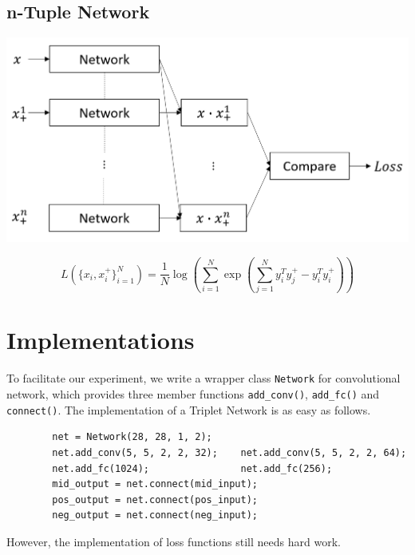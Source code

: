\documentclass[a0,portrait]{a0poster}
\begin{document}
\begin{multicols}{2}
		\subsection*{n-Tuple Network}
		
		\begin{center}\vspace{1cm}
			\includegraphics[width=0.7\linewidth]{../report_shaoheng/tuple_struct}
		\end{center}\vspace{1cm}
		\begin{equation}
		L(\{x_i,x_i^+\}^N_{i=1})=\frac{1}{N}\log(\sum_{i=1}^N\exp(\sum_{j=1}^Ny^T_iy_j^+-y_i^Ty_i^+))  \label{eq:n-pair}
		\end{equation}
		
		\nocite{*} %
		
		
		\section*{Implementations}
		To facilitate our experiment, we write a wrapper class \verb|Network| for convolutional network, which provides three member functions \verb|add_conv()|, \verb|add_fc()| and \verb|connect()|. The implementation of a Triplet Network is as easy as follows.
		\begin{verbatim}
		net = Network(28, 28, 1, 2);
		net.add_conv(5, 5, 2, 2, 32);    net.add_conv(5, 5, 2, 2, 64);
		net.add_fc(1024);                net.add_fc(256);
		mid_output = net.connect(mid_input);
		pos_output = net.connect(pos_input);
		neg_output = net.connect(neg_input);
		\end{verbatim}
		However, the implementation of loss functions still needs hard work.

\end{multicols}
\end{document}
